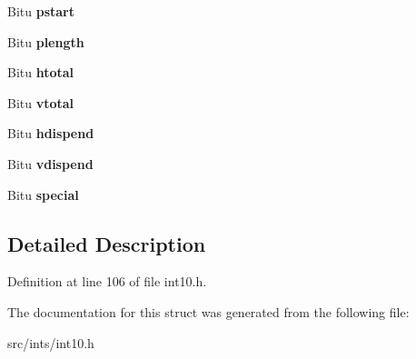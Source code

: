 \begin{DoxyCompactItemize}
\item 
\hypertarget{structVideoModeBlock_ae53459e4e4978f0262a8008199fd1837}{Bitu {\bfseries pstart}}\label{structVideoModeBlock_ae53459e4e4978f0262a8008199fd1837}

\item 
\hypertarget{structVideoModeBlock_ac61dd9ff708f53231ca143d564133e29}{Bitu {\bfseries plength}}\label{structVideoModeBlock_ac61dd9ff708f53231ca143d564133e29}

\item 
\hypertarget{structVideoModeBlock_acb39e7559e59d3d9527c0a46499a423e}{Bitu {\bfseries htotal}}\label{structVideoModeBlock_acb39e7559e59d3d9527c0a46499a423e}

\item 
\hypertarget{structVideoModeBlock_a8f86cecb0e1da8e4092ba9a8b8c7eaaa}{Bitu {\bfseries vtotal}}\label{structVideoModeBlock_a8f86cecb0e1da8e4092ba9a8b8c7eaaa}

\item 
\hypertarget{structVideoModeBlock_a7d7c7b224dfdb93cfb1af7fed4a5c9cf}{Bitu {\bfseries hdispend}}\label{structVideoModeBlock_a7d7c7b224dfdb93cfb1af7fed4a5c9cf}

\item 
\hypertarget{structVideoModeBlock_a4b3b1f96351ad6e6c435ff27953b7526}{Bitu {\bfseries vdispend}}\label{structVideoModeBlock_a4b3b1f96351ad6e6c435ff27953b7526}

\item 
\hypertarget{structVideoModeBlock_abcb9b2b01871da775e89519c4dcb8d0c}{Bitu {\bfseries special}}\label{structVideoModeBlock_abcb9b2b01871da775e89519c4dcb8d0c}

\end{DoxyCompactItemize}


\subsection{Detailed Description}


Definition at line 106 of file int10.\-h.



The documentation for this struct was generated from the following file\-:\begin{DoxyCompactItemize}
\item 
src/ints/int10.\-h\end{DoxyCompactItemize}
